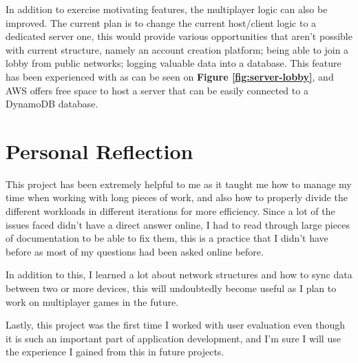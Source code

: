 \documentclass{dissertation}
\begin{document}
In addition to exercise motivating features, the multiplayer logic can also be improved. The current plan is to change the current host/client logic to a dedicated server one, this would provide various opportunities that aren't possible with current structure, namely an account creation platform; being able to join a lobby from public networks; logging valuable data into a database. This feature has been experienced with as can be seen on \textbf{Figure \ref{fig:server-lobby}}, and AWS offers free space to host a server that can be easily connected to a DynamoDB database.

\section{Personal Reflection}

This project has been extremely helpful to me as it taught me how to manage my time when working with long pieces of work, and also how to properly divide the different workloads in different iterations for more efficiency. Since a lot of the issues faced didn't have a direct answer online, I had to read through large pieces of documentation to be able to fix them, this is a practice that I didn't have before as most of my questions had been asked online before.

In addition to this, I learned a lot about network structures and how to sync data between two or more devices, this will undoubtedly become useful as I plan to work on multiplayer games in the future.

Lastly, this project was the first time I worked with user evaluation even though it is such an important part of application development, and I'm sure I will use the experience I gained from this in future projects.
\end{document}
